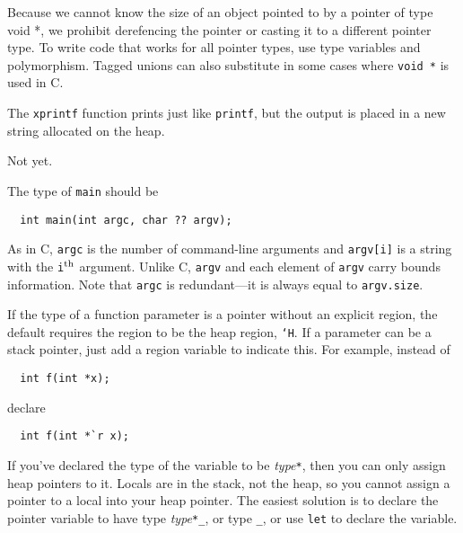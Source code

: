 Because we cannot know the size of an object pointed to by a pointer
of type void *, we prohibit derefencing the pointer or casting it to a
different pointer type.  To write code that works for all pointer
types, use type variables and polymorphism.  Tagged unions can also
substitute in some cases where \texttt{void *} is used in C\@.


The \texttt{xprintf} function prints just like \texttt{printf}, but
the output is placed in a new string allocated on the heap.


Not yet. 


The type of \texttt{main} should be
\begin{verbatim}
  int main(int argc, char ?? argv);
\end{verbatim}
As in C, \texttt{argc} is the number of command-line arguments and
\texttt{argv[i]} is a string with the \texttt{i}$^{\rm th}$ argument.
Unlike C, \texttt{argv} and each element of \texttt{argv} carry bounds
information.  Note that \texttt{argc} is redundant---it is always
equal to \texttt{argv.size}.


If the type of a function parameter is a pointer without an explicit
region, the default requires the region to be the heap region,
\texttt{`H}.  If a parameter can be a stack pointer, just add a region
variable to indicate this.  For example, instead of
\begin{verbatim}
  int f(int *x);
\end{verbatim}
declare
\begin{verbatim}
  int f(int *`r x);
\end{verbatim}


If you've declared the type of the variable to be
\textit{type}\texttt{*}, then you can only assign heap pointers to it.
Locals are in the stack, not the heap, so you cannot assign a pointer
to a local into your heap pointer.  The easiest solution is to declare
the pointer variable to have type \textit{type}\texttt{*_}, or type
\texttt{_}, or use \texttt{let} to declare the variable.

